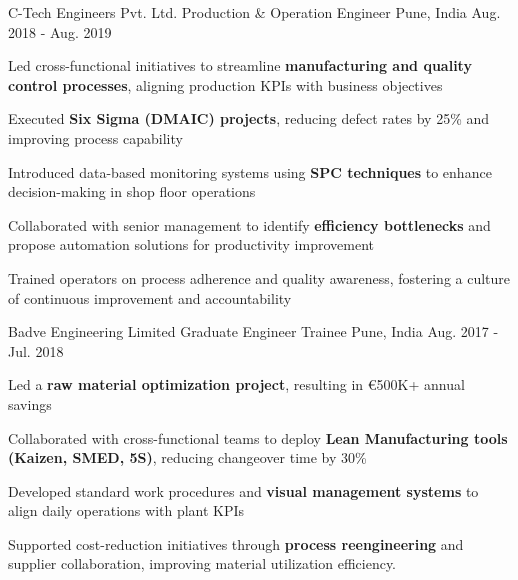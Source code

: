 \begin{cventries}
  \cventry
    {C-Tech Engineers Pvt. Ltd.} %
    {Production \& Operation Engineer} %
    {Pune, India} %
    {Aug. 2018 - Aug. 2019} %
    {
      \begin{cvitems} %
        \item {Led cross-functional initiatives to streamline \textbf{manufacturing and quality control processes}, aligning production KPIs with business objectives}
        \item {Executed \textbf{Six Sigma (DMAIC) projects}, reducing defect rates by 25\% and improving process capability}
        \item {Introduced data-based monitoring systems using \textbf{SPC techniques} to enhance decision-making in shop floor operations}
        \item {Collaborated with senior management to identify \textbf{efficiency bottlenecks} and propose automation solutions for productivity improvement}
        \item {Trained operators on process adherence and quality awareness, fostering a culture of continuous improvement and accountability}
      \end{cvitems}
    }
    
  \cventry
    {Badve Engineering Limited} %
    {Graduate Engineer Trainee} %
    {Pune, India} %
    {Aug. 2017 - Jul. 2018} %
    {
      \begin{cvitems} %
        \item {Led a \textbf{raw material optimization project}, resulting in €500K+ annual savings}
        \item {Collaborated with cross-functional teams to deploy \textbf{Lean Manufacturing tools (Kaizen, SMED, 5S)}, reducing changeover time by 30\%}
        \item {Developed standard work procedures and \textbf{visual management systems} to align daily operations with plant KPIs}
        \item {Supported cost-reduction initiatives through \textbf{process reengineering} and supplier collaboration, improving material utilization efficiency.}
      \end{cvitems}
    }


\end{cventries}
